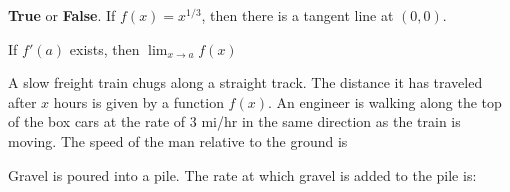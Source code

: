 \documentclass{ximera}
\newcommand{\recommendation}[1]{}
\newcommand{\GoodQuestions}[1]{}
\begin{document}
\begin{shuffle}
\begin{problem}
  \recommendation{Vic}
  \GoodQuestions{Subject: Derivatives 2Q}


  \textbf{True} or \textbf{False}.  If $f(x)=x^{1/3}$, then there is a
  tangent line at $(0,0)$.
  \begin{multipleChoice}
  \end{multipleChoice}
\end{problem}

\begin{problem}
  \recommendation{Vic}

  \GoodQuestions{Subject: Derivatives 7P}
  If $f'(a)$ exists, then $\lim_{x\to a}f(x)$
  \begin{multipleChoice}
  \end{multipleChoice}
\end{problem}


\begin{problem}
  \recommendation{Vic}

  \GoodQuestions{Subject: Derivatives 9Q}
  A slow freight train chugs along a straight track.  The distance it
  has traveled after $x$ hours is given by a function $f(x)$.  An
  engineer is walking along the top of the box cars at the rate of $3$
  mi/hr in the same direction as the train is moving.  The speed of
  the man relative to the ground is
  \begin{multipleChoice}
  \end{multipleChoice}
\end{problem}



\begin{problem}
  \recommendation{Vic}

  \GoodQuestions{Subject: Derivative Rules 6P}
  Gravel is poured into a pile. The rate at which gravel is added to
  the pile is:
\begin{multipleChoice}
\end{multipleChoice}
\end{problem}




\end{shuffle}
\end{document}
